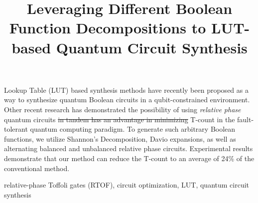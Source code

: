 \documentclass[paper]{ieice}
\title{Leveraging Different Boolean Function Decompositions to \DIFdelbegin \DIFdel{Optimize }\DIFdelend \DIFaddbegin \DIFadd{Reduce T-Count in }\DIFaddend LUT-based Quantum Circuit Synthesis}
\providecommand{\DIFadd}[1]{{\protect\color{blue}{#1}}} %
\providecommand{\DIFdel}[1]{{\protect\color{red}\sout{#1}}}                      %
\providecommand{\DIFaddbegin}{} %
\providecommand{\DIFaddend}{} %
\providecommand{\DIFdelbegin}{} %
\providecommand{\DIFdelend}{} %
\newcommand{\DIFscaledelfig}{0.5}
\newlength{\DIFdelgraphicswidth} %
\newlength{\DIFdelgraphicsheight} %
\newcommand{\DIFaddincludegraphics}[2][]{{\color{blue}\fbox{\DIFOincludegraphics[#1]{#2}}}} %
\newcommand{\DIFdelincludegraphics}[2][]{%
\sbox{\DIFdelgraphicsbox}{\DIFOincludegraphics[#1]{#2}}%
\settoboxwidth{\DIFdelgraphicswidth}{\DIFdelgraphicsbox} %
\settoboxtotalheight{\DIFdelgraphicsheight}{\DIFdelgraphicsbox} %
\scalebox{\DIFscaledelfig}{%
\parbox[b]{\DIFdelgraphicswidth}{\usebox{\DIFdelgraphicsbox}\\[-\baselineskip] \rule{\DIFdelgraphicswidth}{0em}}\llap{\resizebox{\DIFdelgraphicswidth}{\DIFdelgraphicsheight}{%
\setlength{\unitlength}{\DIFdelgraphicswidth}%
\begin{picture}(1,1)%
\thicklines\linethickness{2pt} %
{\color[rgb]{1,0,0}\put(0,0){\framebox(1,1){}}}%
{\color[rgb]{1,0,0}\put(0,0){\line( 1,1){1}}}%
{\color[rgb]{1,0,0}\put(0,1){\line(1,-1){1}}}%
\end{picture}%
}\hspace*{3pt}}} %
} %
\DeclareRobustCommand{\DIFaddbegin}{\DIFOaddbegin \let\includegraphics\DIFaddincludegraphics} %
\DeclareRobustCommand{\DIFaddend}{\DIFOaddend \let\includegraphics\DIFOincludegraphics} %
\DeclareRobustCommand{\DIFdelbegin}{\DIFOdelbegin \let\includegraphics\DIFdelincludegraphics} %
\DeclareRobustCommand{\DIFdelend}{\DIFOaddend \let\includegraphics\DIFOincludegraphics} %
\begin{document}
\maketitle

\begin{summary}
  \DIFaddbegin 

  \DIFaddend Lookup Table (LUT) based synthesis methods have recently been proposed as a way to synthesize quantum Boolean circuits
  in a qubit-constrained environment. Other recent research has demonstrated the possibility of using {\it relative phase}
  quantum circuits \DIFdelbegin \DIFdel{in tandem has an advantage in minimizing }\DIFdelend \DIFaddbegin \DIFadd{when compute/uncompute logic is used in tandem, reducing }\DIFaddend T-count in \DIFaddbegin \DIFadd{quantum Boolean circuits in
  }\DIFaddend the fault-tolerant quantum computing paradigm. \DIFaddbegin \DIFadd{Because LUT-based synthesis methods use compute/uncompute pairs on ancilla
  qubits, this suggests that implementing the arbitrary Boolean logic that make up the individual Boolean logic network nodes
  in a relative phase manner could reduce the T-count. }\DIFaddend To generate such arbitrary Boolean functions, we utilize Shannon's
  Decomposition, Davio expansions, as well as alternating balanced and unbalanced relative  phase circuits. Experimental results
  demonstrate that our method can reduce the T-count to an average of 24\% of the conventional method. 

\end{summary}
\begin{keywords}
relative-phase Toffoli gates (RTOF), circuit optimization, LUT, quantum circuit synthesis
\end{keywords}
\setlength\textfloatsep{4pt}
\setlength\floatsep{0pt}
\setlength\abovecaptionskip{4pt}
\end{document}
